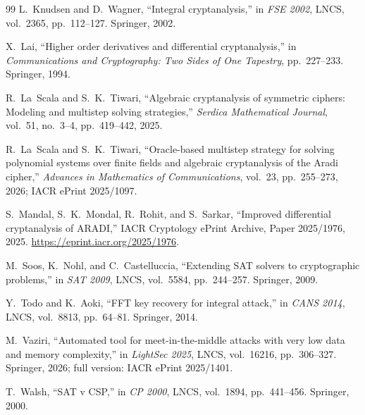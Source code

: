 \documentclass[11pt,a4paper]{article}
\theoremstyle{definition}
\theoremstyle{remark}
\begin{document}
\begin{thebibliography}{99}
L.~Knudsen and D.~Wagner,
``Integral cryptanalysis,''
in \emph{FSE 2002}, LNCS, vol.~2365, pp.~112--127. Springer, 2002.

X.~Lai,
``Higher order derivatives and differential cryptanalysis,''
in \emph{Communications and Cryptography: Two Sides of One Tapestry}, pp.~227--233. Springer, 1994.

R.~La~Scala and S.~K.~Tiwari,
``Algebraic cryptanalysis of symmetric ciphers: Modeling and multistep solving strategies,''
\emph{Serdica Mathematical Journal}, vol.~51, no.~3--4, pp.~419--442, 2025.

R.~La~Scala and S.~K.~Tiwari,
``Oracle-based multistep strategy for solving polynomial systems over finite fields and algebraic cryptanalysis of the Aradi cipher,''
\emph{Advances in Mathematics of Communications}, vol.~23, pp.~255--273, 2026; IACR ePrint 2025/1097.

S.~Mandal, S.~K.~Mondal, R.~Rohit, and S.~Sarkar,
``Improved differential cryptanalysis of ARADI,''
IACR Cryptology ePrint Archive, Paper 2025/1976, 2025. \url{https://eprint.iacr.org/2025/1976}.

M.~Soos, K.~Nohl, and C.~Castelluccia,
``Extending SAT solvers to cryptographic problems,''
in \emph{SAT 2009}, LNCS, vol.~5584, pp.~244--257. Springer, 2009.

Y.~Todo and K.~Aoki,
``FFT key recovery for integral attack,''
in \emph{CANS 2014}, LNCS, vol.~8813, pp.~64--81. Springer, 2014.

M.~Vaziri,
``Automated tool for meet-in-the-middle attacks with very low data and memory complexity,''
in \emph{LightSec 2025}, LNCS, vol.~16216, pp.~306--327. Springer, 2026; full version: IACR ePrint 2025/1401.

T.~Walsh,
``SAT v CSP,''
in \emph{CP 2000}, LNCS, vol.~1894, pp.~441--456. Springer, 2000.

\end{thebibliography}
\end{document}
